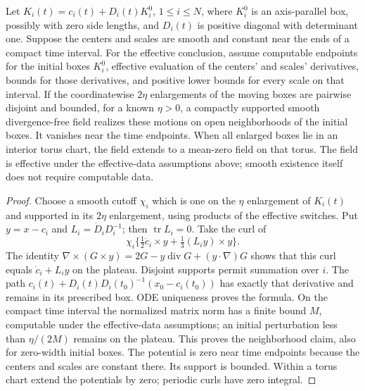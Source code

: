 \begin{lemma}
\label{lem:bb-curl}
Let $K_i(t)=c_i(t)+D_i(t)K_i^0$, $1\le i\le N$, where $K_i^0$ is
an axis-parallel box, possibly with zero side lengths, and $D_i(t)$ is
positive diagonal with determinant one.  Suppose the centers and scales
are smooth and constant near the ends of a compact time interval.
For the effective conclusion, assume computable endpoints for the
initial boxes $K_i^0$, effective evaluation of the centers' and scales'
derivatives, bounds for those derivatives, and positive lower bounds
for every scale on that interval.
If the coordinatewise $2\eta$ enlargements of the moving boxes are
pairwise disjoint and bounded, for a known $\eta>0$, a
compactly supported smooth divergence-free field realizes these motions
on open neighborhoods of the initial boxes.  It vanishes near the time
endpoints.  When all enlarged boxes lie in an interior torus chart,
the field extends to a mean-zero field on that torus.
The field is effective under the effective-data assumptions above;
smooth existence itself does not require computable data.
\end{lemma}
\begin{proof}
Choose a smooth cutoff $\chi_i$ which is one on the $\eta$
enlargement of $K_i(t)$ and supported in its $2\eta$ enlargement,
using products of the effective switches.  Put $y=x-c_i$ and
$L_i=\dot D_iD_i^{-1}$; then $\operatorname{tr}L_i=0$.
Take the curl of
\begin{equation}\label{eq:bb-potential}
 \chi_i\{\tfrac12\dot c_i\times y+\tfrac13(L_i y)\times y\}.
\end{equation}
The identity
$\nabla\times(G\times y)=2G-y\operatorname{div}G+(y\cdot\nabla)G$
shows that this curl equals $\dot c_i+L_i y$ on the plateau.
Disjoint supports permit summation over $i$.  The path
$c_i(t)+D_i(t)D_i(t_0)^{-1}(x_0-c_i(t_0))$ has exactly that
derivative and remains in its prescribed box.  ODE uniqueness proves
the formula.  On the compact time interval the normalized matrix norm
has a finite bound $M$, computable under the effective-data assumptions;
an initial perturbation less than
$\eta/(2M)$ remains on the plateau.  This proves the neighborhood
claim, also for zero-width initial boxes.
The potential is zero near time endpoints because the centers and
scales are constant there.  Its support is bounded.  Within a torus
chart extend the potentials by zero; periodic curls have zero integral.
\end{proof}

